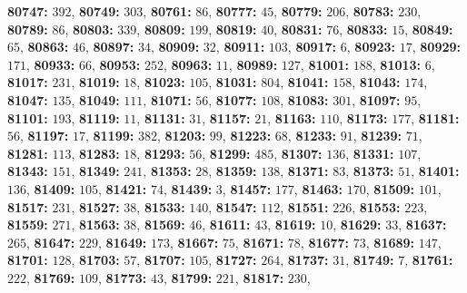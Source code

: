 \textsf{\bfseries 80747:} $392$, \textsf{\bfseries 80749:} $303$, \textsf{\bfseries 80761:} $86$, \textsf{\bfseries 80777:} $45$, \textsf{\bfseries 80779:} $206$, \textsf{\bfseries 80783:} $230$, \textsf{\bfseries 80789:} $86$, \textsf{\bfseries 80803:} $339$, \textsf{\bfseries 80809:} $199$, \textsf{\bfseries 80819:} $40$, \textsf{\bfseries 80831:} $76$, \textsf{\bfseries 80833:} $15$, \textsf{\bfseries 80849:} $65$, \textsf{\bfseries 80863:} $46$, \textsf{\bfseries 80897:} $34$, \textsf{\bfseries 80909:} $32$, \textsf{\bfseries 80911:} $103$, \textsf{\bfseries 80917:} $6$, \textsf{\bfseries 80923:} $17$, \textsf{\bfseries 80929:} $171$, \textsf{\bfseries 80933:} $66$, \textsf{\bfseries 80953:} $252$, \textsf{\bfseries 80963:} $11$, \textsf{\bfseries 80989:} $127$, \textsf{\bfseries 81001:} $188$, \textsf{\bfseries 81013:} $6$, \textsf{\bfseries 81017:} $231$, \textsf{\bfseries 81019:} $18$, \textsf{\bfseries 81023:} $105$, \textsf{\bfseries 81031:} $804$, \textsf{\bfseries 81041:} $158$, \textsf{\bfseries 81043:} $174$, \textsf{\bfseries 81047:} $135$, \textsf{\bfseries 81049:} $111$, \textsf{\bfseries 81071:} $56$, \textsf{\bfseries 81077:} $108$, \textsf{\bfseries 81083:} $301$, \textsf{\bfseries 81097:} $95$, \textsf{\bfseries 81101:} $193$, \textsf{\bfseries 81119:} $11$, \textsf{\bfseries 81131:} $31$, \textsf{\bfseries 81157:} $21$, \textsf{\bfseries 81163:} $110$, \textsf{\bfseries 81173:} $177$, \textsf{\bfseries 81181:} $56$, \textsf{\bfseries 81197:} $17$, \textsf{\bfseries 81199:} $382$, \textsf{\bfseries 81203:} $99$, \textsf{\bfseries 81223:} $68$, \textsf{\bfseries 81233:} $91$, \textsf{\bfseries 81239:} $71$, \textsf{\bfseries 81281:} $113$, \textsf{\bfseries 81283:} $18$, \textsf{\bfseries 81293:} $56$, \textsf{\bfseries 81299:} $485$, \textsf{\bfseries 81307:} $136$, \textsf{\bfseries 81331:} $107$, \textsf{\bfseries 81343:} $151$, \textsf{\bfseries 81349:} $241$, \textsf{\bfseries 81353:} $28$, \textsf{\bfseries 81359:} $138$, \textsf{\bfseries 81371:} $83$, \textsf{\bfseries 81373:} $51$, \textsf{\bfseries 81401:} $136$, \textsf{\bfseries 81409:} $105$, \textsf{\bfseries 81421:} $74$, \textsf{\bfseries 81439:} $3$, \textsf{\bfseries 81457:} $177$, \textsf{\bfseries 81463:} $170$, \textsf{\bfseries 81509:} $101$, \textsf{\bfseries 81517:} $231$, \textsf{\bfseries 81527:} $38$, \textsf{\bfseries 81533:} $140$, \textsf{\bfseries 81547:} $112$, \textsf{\bfseries 81551:} $226$, \textsf{\bfseries 81553:} $223$, \textsf{\bfseries 81559:} $271$, \textsf{\bfseries 81563:} $38$, \textsf{\bfseries 81569:} $46$, \textsf{\bfseries 81611:} $43$, \textsf{\bfseries 81619:} $10$, \textsf{\bfseries 81629:} $33$, \textsf{\bfseries 81637:} $265$, \textsf{\bfseries 81647:} $229$, \textsf{\bfseries 81649:} $173$, \textsf{\bfseries 81667:} $75$, \textsf{\bfseries 81671:} $78$, \textsf{\bfseries 81677:} $73$, \textsf{\bfseries 81689:} $147$, \textsf{\bfseries 81701:} $128$, \textsf{\bfseries 81703:} $57$, \textsf{\bfseries 81707:} $105$, \textsf{\bfseries 81727:} $264$, \textsf{\bfseries 81737:} $31$, \textsf{\bfseries 81749:} $7$, \textsf{\bfseries 81761:} $222$, \textsf{\bfseries 81769:} $109$, \textsf{\bfseries 81773:} $43$, \textsf{\bfseries 81799:} $221$, \textsf{\bfseries 81817:} $230$, 
